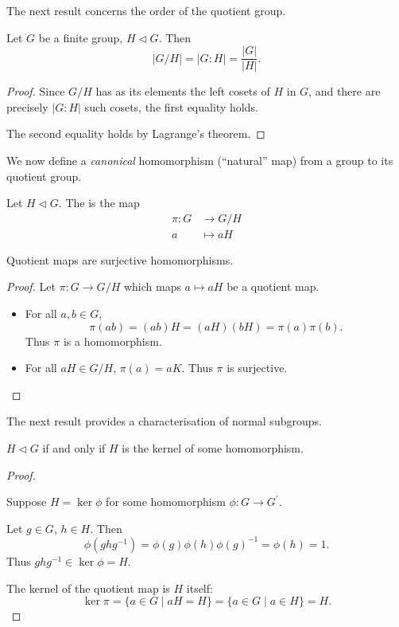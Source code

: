 The next result concerns the order of the quotient group.

\begin{lemma}
Let $G$ be a finite group, $H\triangleleft G$. Then
\[|G/H|=|G:H|=\frac{|G|}{|H|}.\]
\end{lemma}

\begin{proof}
Since $G/H$ has as its elements the left cosets of $H$ in $G$, and there are precisely $|G:H|$ such cosets, the first equality holds.

The second equality holds by Lagrange's theorem.
\end{proof}

We now define a \emph{canonical} homomorphism (``natural'' map) from a group to its quotient group.

\begin{definition}
Let $H\triangleleft G$. The  is the map
\begin{align*}
\pi\colon G&\to G/H\\
a&\mapsto aH
\end{align*}
\end{definition}

\begin{lemma}
Quotient maps are surjective homomorphisms.
\end{lemma}

\begin{proof}
Let $\pi\colon G\to G/H$ which maps $a\mapsto aH$ be a quotient map.
\begin{itemize}
\item For all $a,b\in G$,
\[\pi(ab)=(ab)H=(aH)(bH)=\pi(a)\pi(b).\]
Thus $\pi$ is a homomorphism.
\item For all $aH\in G/H$, $\pi(a)=aK$. Thus $\pi$ is surjective.
\end{itemize}
\end{proof}

The next result provides a characterisation of normal subgroups.

\begin{lemma}
$H\triangleleft G$ if and only if $H$ is the kernel of some homomorphism.
\end{lemma}

\begin{proof} \

\backward Suppose $H=\ker\phi$ for some homomorphism $\phi\colon G\to G^\prime$. 

Let $g\in G$, $h\in H$. Then
\[\phi(ghg^{-1})=\phi(g)\phi(h)\phi(g)^{-1}=\phi(h)=1.\]
Thus $ghg^{-1}\in\ker\phi=H$.

\forward The kernel of the quotient map is $H$ itself:
\[\ker\pi=\{a\in G\mid aH=H\}=\{a\in G\mid a\in H\}=H.\]
\end{proof}

